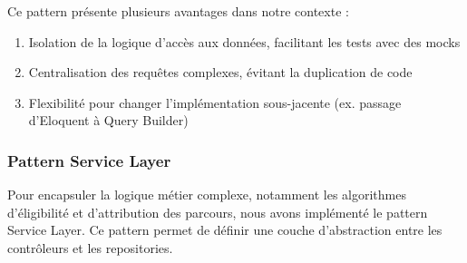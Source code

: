 \documentclass[french,12pt]{report} %
\begin{document}
Ce pattern présente plusieurs avantages dans notre contexte :

\begin{enumerate}
    \item Isolation de la logique d'accès aux données, facilitant les tests avec des mocks
    \item Centralisation des requêtes complexes, évitant la duplication de code
    \item Flexibilité pour changer l'implémentation sous-jacente (ex. passage d'Eloquent à Query Builder)
\end{enumerate}

\subsubsection{Pattern Service Layer}

Pour encapsuler la logique métier complexe, notamment les algorithmes d'éligibilité et d'attribution des parcours, nous avons implémenté le pattern Service Layer. Ce pattern permet de définir une couche d'abstraction entre les contrôleurs et les repositories.
\end{document}
